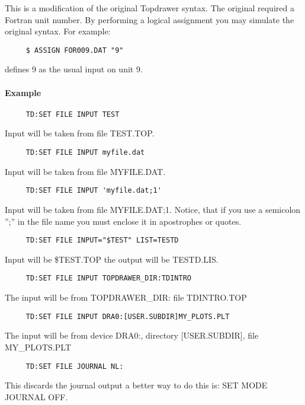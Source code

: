 This  is  a  modification  of  the  original  Topdrawer  syntax.  The
original required a Fortran unit number.   By  performing  a  logical
assignment you may simulate the original syntax.  For example:  
\begin{verbatim}
     $ ASSIGN FOR009.DAT "9" 
\end{verbatim}
defines 9 as the usual input on unit 9.  
\paragraph{Example}
\begin{verbatim}
     TD:SET FILE INPUT TEST 
\end{verbatim}
Input will be taken from file TEST.TOP.  
\begin{verbatim}
     TD:SET FILE INPUT myfile.dat 
\end{verbatim}
Input will be taken from file MYFILE.DAT.  
\begin{verbatim}
     TD:SET FILE INPUT 'myfile.dat;1' 
\end{verbatim}
Input  will be taken from file MYFILE.DAT;1.  Notice, that if you use
a semicolon '';'' in the file name you must enclose it  in  apostrophes
or quotes.  

\begin{verbatim}
     TD:SET FILE INPUT="$TEST" LIST=TESTD 
\end{verbatim}
Input will be \$TEST.TOP the output will be TESTD.LIS.  

\begin{verbatim}
     TD:SET FILE INPUT TOPDRAWER_DIR:TDINTRO 
\end{verbatim}
The input will be from TOPDRAWER\_DIR:  file TDINTRO.TOP 

\begin{verbatim}
     TD:SET FILE INPUT DRA0:[USER.SUBDIR]MY_PLOTS.PLT 
\end{verbatim}
The  input  will  be from device DRA0:, directory [USER.SUBDIR], file
MY\_PLOTS.PLT 
\begin{verbatim}
     TD:SET FILE JOURNAL NL:  
\end{verbatim}
This  discards  the  journal  output  a  better  way  to  do this is:
SET MODE JOURNAL OFF.  
